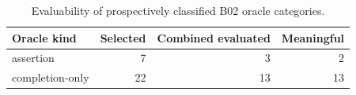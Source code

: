 \begin{table}[t]
\centering
\caption{Evaluability of prospectively classified B02 oracle categories.}
\label{tab:rq2-oracle-attrition}
\begin{tabular}{lrrr}
\toprule
Oracle kind & Selected & Combined evaluated & Meaningful \\
\midrule
assertion & 7 & 3 & 2 \\
completion-only & 22 & 13 & 13 \\
\bottomrule
\end{tabular}
\end{table}
